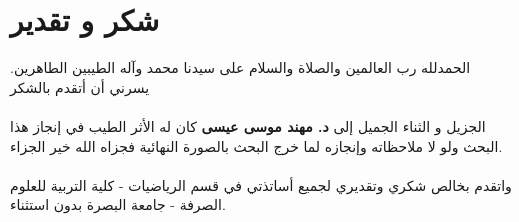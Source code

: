 \chapter*{شكر و تقدير}

الحمدلله رب العالمين والصلاة والسلام على سيدنا محمد وآله الطيبين الطاهرين. يسرني أن أتقدم بالشكر\\ \\ الجزيل و الثناء الجميل إلى \textbf{د. مهند موسى عيسى} كان له الأثر الطيب في إنجاز هذا البحث ولو لا ملاحظاته وإنجازه لما خرج البحث بالصورة النهائية فجزاه الله خير الجزاء.\\
\\
واتقدم بخالص شكري وتقديري لجميع أساتذتي في قسم الرياضيات - كلية التربية للعلوم الصرفة - جامعة البصرة بدون استثناء.

\arabicfont